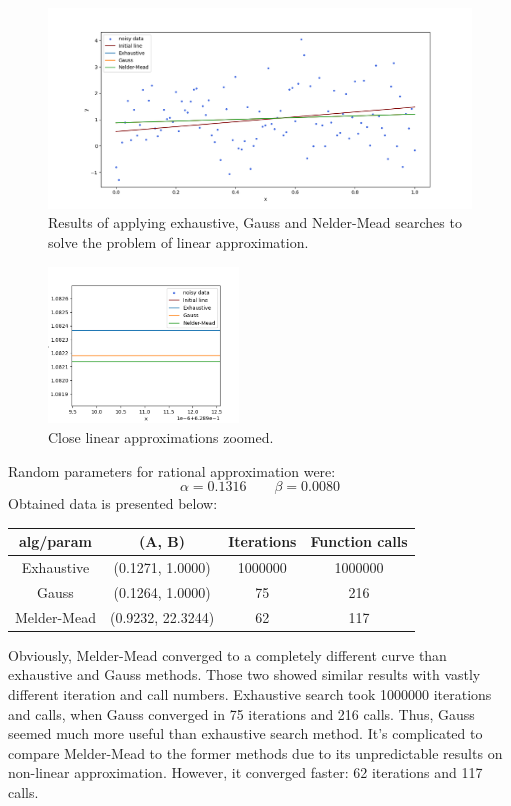 \documentclass[12pt, a4paper]{article}
\begin{document}
\newpage

\begin{figure}[!h]
\centering
\includegraphics[width=\textwidth]{line1.png}
\caption{Results of applying exhaustive, Gauss and Nelder-Mead searches to solve the problem of linear approximation.}
\end{figure}

\begin{figure}[!h]
\centering
\includegraphics[width=0.45\textwidth]{line2.png}
\caption{Close linear approximations zoomed.}
\end{figure}

Random parameters for rational approximation were:
\[ \alpha = 0.1316 \qquad \beta = 0.0080 \]
Obtained data is presented below:
\begin{center}
\begin{tabular}{cccc}
\hline
alg/param   & (A, B)            & Iterations & Function calls \\ \hline
Exhaustive  & (0.1271, 1.0000)  & 1000000    & 1000000        \\
Gauss       & (0.1264, 1.0000)  & 75         & 216            \\
Melder-Mead & (0.9232, 22.3244) & 62         & 117             \\ \hline
\end{tabular}
\end{center}
Obviously, Melder-Mead converged to a completely different curve than exhaustive and Gauss methods. Those two showed similar results with vastly different iteration and call numbers. Exhaustive search took 1000000 iterations and calls, when Gauss converged in 75 iterations and 216 calls. Thus, Gauss seemed much more useful than exhaustive search method. It's complicated to compare Melder-Mead to the former methods due to its unpredictable results on non-linear approximation. However, it converged faster: 62 iterations and 117 calls.
\end{document}
